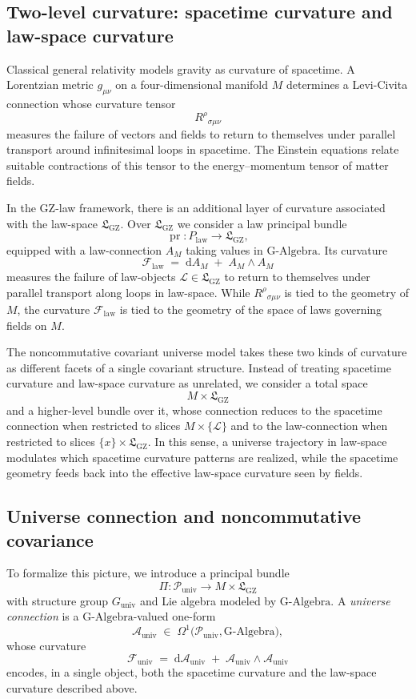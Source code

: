 \documentclass[11pt]{book}
\newcommand{\GAlgebra}{\text{G-Algebra}}
\newcommand{\GZLS}{\ensuremath{\mathfrak{L}_{\mathrm{GZ}}}}
\newcommand{\GZLOC}{\ensuremath{A_M}}
\newcommand{\GZLCurv}{\ensuremath{\mathcal{F}_{\mathrm{law}}}}
\newcommand{\Base}{\ensuremath{M}}
\newcommand{\Bundle}{\ensuremath{P}}
\newcommand{\pr}{\operatorname{pr}}
\theoremstyle{plain}
\theoremstyle{definition}
\theoremstyle{remark}
\begin{document}
\subsection{Two-level curvature: spacetime curvature and law-space curvature}
\label{subsec:two-level-curvature}


Classical general relativity models gravity as curvature of
spacetime. A Lorentzian metric $g_{\mu\nu}$ on a four-dimensional
manifold $\Base$ determines a Levi-Civita connection whose curvature
tensor
\[
   R^\rho{}_{\sigma\mu\nu}
\]
measures the failure of vectors and fields to return to themselves
under parallel transport around infinitesimal loops in spacetime.
The Einstein equations relate suitable contractions of this tensor
to the energy--momentum tensor of matter fields.

In the GZ-law framework, there is an additional layer of curvature
associated with the law-space $\GZLS$. Over $\GZLS$ we consider a
law principal bundle
\[
   \pr \colon \Bundle_{\mathrm{law}} \longrightarrow \GZLS,
\]
equipped with a law-connection $\GZLOC$ taking values in
$\GAlgebra$. Its curvature
\[
   \GZLCurv \;=\; \mathrm{d}\GZLOC \;+\; \GZLOC \wedge \GZLOC
\]
measures the failure of law-objects $\mathcal{L} \in \GZLS$ to
return to themselves under parallel transport along loops in
law-space. While $R^\rho{}_{\sigma\mu\nu}$ is tied to the geometry
of $\Base$, the curvature $\GZLCurv$ is tied to the geometry of the
space of laws governing fields on $\Base$.

The noncommutative covariant universe model takes these two kinds
of curvature as different facets of a single covariant structure.
Instead of treating spacetime curvature and law-space curvature as
unrelated, we consider a total space
\[
   \Base \times \GZLS
\]
and a higher-level bundle over it, whose connection reduces to the
spacetime connection when restricted to slices $\Base \times
\{\mathcal{L}\}$ and to the law-connection when restricted to
slices $\{x\} \times \GZLS$. In this sense, a universe trajectory
in law-space modulates which spacetime curvature patterns are
realized, while the spacetime geometry feeds back into the
effective law-space curvature seen by fields.

\subsection{Universe connection and noncommutative covariance}
\label{subsec:universe-connection}


To formalize this picture, we introduce a principal bundle
\[
   \Pi \colon \mathcal{P}_{\mathrm{univ}} \longrightarrow
   \Base \times \GZLS
\]
with structure group $G_{\mathrm{univ}}$ and Lie algebra modeled
by $\GAlgebra$. A \emph{universe connection} is a
$\GAlgebra$-valued one-form
\[
   \mathcal{A}_{\mathrm{univ}} \;\in\;
   \Omega^1\bigl(\mathcal{P}_{\mathrm{univ}},\GAlgebra\bigr),
\]
whose curvature
\[
   \mathcal{F}_{\mathrm{univ}}
   \;=\;
   \mathrm{d}\mathcal{A}_{\mathrm{univ}}
   \;+\;
   \mathcal{A}_{\mathrm{univ}} \wedge \mathcal{A}_{\mathrm{univ}}
\]
encodes, in a single object, both the spacetime curvature and the
law-space curvature described above.
\end{document}
